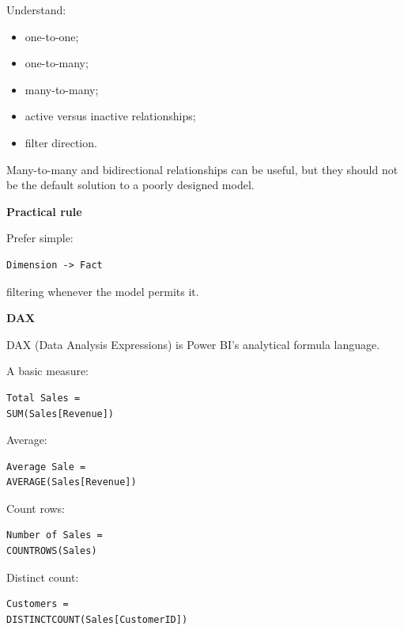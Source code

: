 \documentclass[11pt,letterpaper]{article}
\begin{document}
Understand:

\begin{itemize}[leftmargin=*]
    \item one-to-one;
    \item one-to-many;
    \item many-to-many;
    \item active versus inactive relationships;
    \item filter direction.
\end{itemize}

Many-to-many and bidirectional relationships can be useful, but they should not
be the default solution to a poorly designed model.

\textbf{Practical rule}

Prefer simple:

\begin{lstlisting}
Dimension -> Fact
\end{lstlisting}

filtering whenever the model permits it.



\textbf{DAX}

DAX (Data Analysis Expressions) is Power BI's analytical formula language.

A basic measure:

\begin{lstlisting}
Total Sales =
SUM(Sales[Revenue])
\end{lstlisting}

Average:

\begin{lstlisting}
Average Sale =
AVERAGE(Sales[Revenue])
\end{lstlisting}

Count rows:

\begin{lstlisting}
Number of Sales =
COUNTROWS(Sales)
\end{lstlisting}

Distinct count:

\begin{lstlisting}
Customers =
DISTINCTCOUNT(Sales[CustomerID])
\end{lstlisting}


\end{document}
